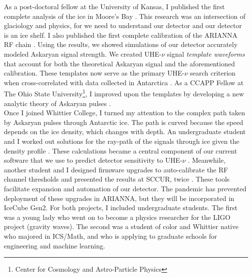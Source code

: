\documentclass[../../main.tex]{subfiles}
\begin{document}
As a post-doctoral fellow at the University of Kansas, I published the first complete analysis of the ice in Moore's Bay \cite{10.3189/2015jog14j214}.  This research was an intersection of glaciology and physics, for we need to understand our detector and our detector is an ice shelf.  I also published the first complete calibration of the ARIANNA RF chain \cite{10.1016/j.astropartphys.2014.09.002}. Using the results, we showed simulations of our detector accurately modeled Askaryan signal strength.  We created UHE-$\nu$ signal \textit{template waveforms} that account for both the theoretical Askaryan signal and the aforementioned calibration.  These templates now serve as the primary UHE-$\nu$ search criterion when cross-correlated with data collected in Antarctica \cite{10.1016/j.astropartphys.2015.04.002} \cite{4_5}.  As a CCAPP Fellow at The Ohio State University\footnote{Center for Cosmology and Astro-Particle Physics}, I improved upon the templates by developing a new analytic theory of Askaryan pulses \cite{10.1016/j.astropartphys.2017.03.008}.
\\
\vspace{0.25cm}
Once I joined Whittier College, I turned my attention to the complex path taken by Askaryan pulses through Antarctic ice.  The path is curved because the speed depends on the ice density, which changes with depth.  An undergraduate student and I worked out solutions for the ray-path of the signals through ice given the density profile \cite{Barwick:2018497}.  These calculations became a central component of our current software that we use to predict detector sensitivity to UHE-$\nu$ \cite{10.1140/epjc/s10052-020-7612-8} \cite{10.1140/epjc/s10052-019-6971-5}.  Meanwhile, another student and I designed firmware upgrades to auto-calibrate the RF channel thresholds and presented the results at SCCUR, twice \cite{sccur1} \cite{sccur2}.  These tools facilitate expansion and automation of our detector.  The pandemic has prevented deployment of these upgrades in ARIANNA, but they will be incorporated in IceCube Gen2.  For both projects, I included undergraduate students.  The first was a young lady who went on to become a physics researcher for the LIGO project (gravity waves).  The second was a student of color and Whittier native who majored in ICS/Math, and who is applying to graduate schools for engineering and machine learning.
\\
\vspace{0.25cm}
\end{document}
